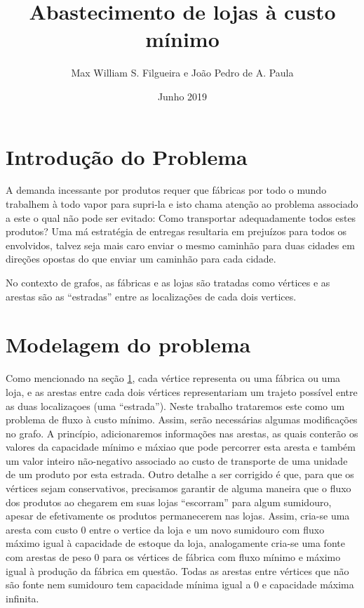 \documentclass[12pt, a4]{article}
\title{Abastecimento de lojas à custo mínimo}
\author{Max William S. Filgueira e João Pedro de A. Paula}
\date{Junho 2019}
\begin{document}
\maketitle

\tableofcontents

\newpage

\section{Introdução do Problema}
\label{sec:intro}

A demanda incessante por produtos requer que fábricas por todo o mundo trabalhem
à todo vapor para supri-la e isto chama atenção ao problema associado a este o
qual não pode ser evitado: Como transportar adequadamente todos estes produtos?
Uma má estratégia de entregas resultaria em prejuízos para todos os envolvidos,
talvez seja mais caro enviar o mesmo caminhão para duas cidades em direções
opostas do que enviar um caminhão para cada cidade.

No contexto de grafos, as fábricas e as lojas são tratadas como vértices e as
arestas são as ``estradas'' entre as localizações de cada dois vertices.

\section{Modelagem do problema}
\label{sec:modelling}

Como mencionado na seção \ref{sec:intro}, cada vértice representa ou uma fábrica
ou uma loja, e as arestas entre cada dois vértices representariam um trajeto
possível entre as duas localizaçoes (uma ``estrada''). Neste trabalho trataremos
este como um problema de fluxo à custo mínimo. Assim, serão necessárias algumas
modificações no grafo. A princípio, adicionaremos informações nas arestas, as
quais conterão os valores da capacidade mínimo e máxiao que pode percorrer esta
aresta e também um valor inteiro não-negativo associado ao custo de transporte
de uma unidade de um produto por esta estrada. Outro detalhe a ser corrigido é
que, para que os vértices sejam conservativos, precisamos garantir de alguma
maneira que o fluxo dos produtos ao chegarem em suas lojas ``escorram'' para
algum sumidouro, apesar de efetivamente os produtos permanecerem nas lojas.
Assim, cria-se uma aresta com custo 0 entre o vertice da loja e um novo
sumidouro com fluxo máximo igual à capacidade de estoque da loja, analogamente
cria-se uma fonte com arestas de peso 0 para os vértices de fábrica com fluxo
mínimo e máximo igual à produção da fábrica em questão. Todas as arestas entre
vértices que não são fonte nem sumidouro tem capacidade mínima igual a 0 e
capacidade máxima infinita.
\end{document}
